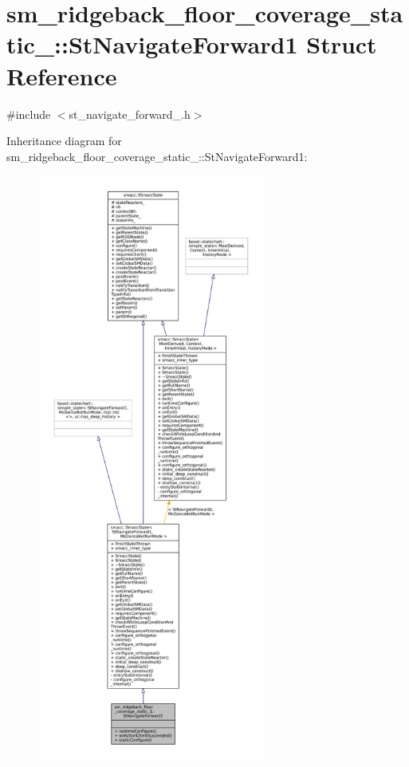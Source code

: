 \hypertarget{structsm__ridgeback__floor__coverage__static__1_1_1StNavigateForward1}{}\section{sm\+\_\+ridgeback\+\_\+floor\+\_\+coverage\+\_\+static\+\_\+:\+:St\+Navigate\+Forward1 Struct Reference}
\label{structsm__ridgeback__floor__coverage__static__1_1_1StNavigateForward1}


{\ttfamily \#include $<$st\+\_\+navigate\+\_\+forward\+\_.\+h$>$}



Inheritance diagram for sm\+\_\+ridgeback\+\_\+floor\+\_\+coverage\+\_\+static\+\_\+:\+:St\+Navigate\+Forward1\+:
\nopagebreak
\begin{figure}[H]
\begin{center}
\leavevmode
\includegraphics[height=550pt]{structsm__ridgeback__floor__coverage__static__1_1_1StNavigateForward1__inherit__graph}
\end{center}
\end{figure}


